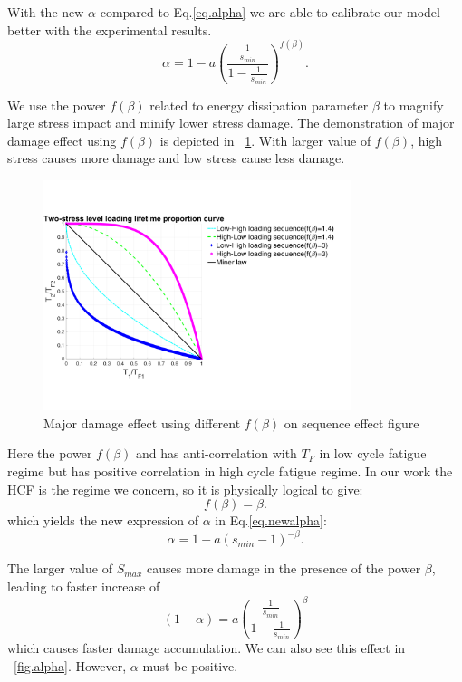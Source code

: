 \documentclass[3p,times,number,review]{elsarticle}
\newcommand{\figref}[1]{\figurename~\ref{#1}}
\begin{document}
With the new $\alpha$ compared to Eq.\eqref{eq.alpha} we are able to calibrate our model better with the experimental results. 
$$\alpha=1-a\left(  \dfrac{\frac{1}{s_{min}}}{1-\frac{1}{s_{min}}} \right) ^{f(\beta)}.$$

We use the power $f(\beta)$ related to energy dissipation parameter $\beta$ to magnify large stress impact and minify lower stress damage.  The demonstration of major damage effect using  $f(\beta)$ is depicted in \figref{fig.sequenceours}. With larger value of $f(\beta)$, high stress causes more damage and low stress cause less damage.

\begin{figure}[!h]
	\centering
	\includegraphics[width=0.8\textwidth]{figures//sequence_ours.png} 
	\caption{Major damage effect using different $f(\beta)$ on sequence effect figure}
	\label{fig.sequenceours}
\end{figure}

Here the power $f(\beta)$ and has anti-correlation with $T_F$ in low cycle fatigue regime but has positive correlation in high cycle fatigue regime. In our work the HCF is the regime we concern, so it is physically logical to give:
$$f(\beta)=\beta.$$
which yields the new expression of $\alpha$ in Eq.\eqref{eq.newalpha}:
\begin{equation}
\alpha=1-a\left(  s_{min}-1 \right) ^{-\beta}.
\label{eq.newalpha}
\end{equation}

The larger value of $S_{max}$ causes more damage in the presence of the power $\beta$, leading to faster increase of $$(1-\alpha)=a\left(  \dfrac{\frac{1}{s_{min}}}{1-\frac{1}{s_{min}}} \right) ^\beta$$ 
which causes faster damage accumulation. We can also see this effect in \figref{fig.alpha}. However, $\alpha$ must be positive. 
\end{document}
